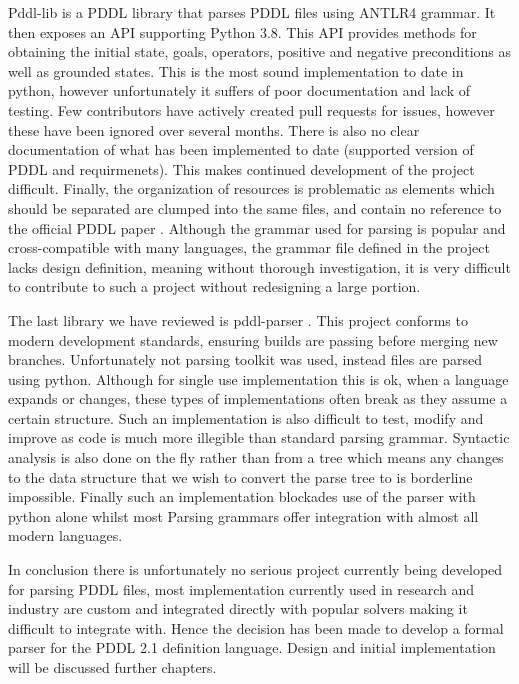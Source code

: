 Pddl-lib \cite{hfoffani23:online} is a PDDL library that parses PDDL files using ANTLR4 grammar. It then exposes an API supporting Python 3.8. This API provides methods for obtaining the initial state, goals, operators, positive and negative preconditions as well as grounded states. This is the most sound implementation to date in python, however unfortunately it suffers of poor documentation and lack of testing. Few contributors have actively created pull requests for issues, however these have been ignored over several months. There is also no clear documentation of what has been implemented to date (supported version of PDDL and requirmenets). This makes continued development of the project difficult. Finally, the organization of resources is problematic as elements which should be separated are clumped into the same files, and contain no reference to the official PDDL paper \cite{httpsarx9:online}. Although the grammar used for parsing is popular and cross-compatible with many languages, the grammar file defined in the project lacks design definition, meaning without thorough investigation, it is very difficult to contribute to such a project without redesigning a large portion.

The last library we have reviewed is pddl-parser \cite{pucrsaut37:online}. This project conforms to modern development standards, ensuring builds are passing before merging new branches. Unfortunately not parsing toolkit was used, instead files are parsed using python. Although for single use implementation this is ok, when a language expands or changes, these types of implementations often break as they assume a certain structure. Such an implementation is also difficult to test, modify and improve as code is much more illegible than standard parsing grammar.
Syntactic analysis is also done on the fly rather than from a tree which means any changes to the data structure that we wish to convert the parse tree to is borderline impossible. Finally such an implementation blockades use of the parser with python alone whilst most Parsing grammars offer integration with almost all modern languages.

In conclusion there is unfortunately no serious project currently being developed for parsing PDDL files, most implementation currently used in research and industry are custom and integrated directly with popular solvers making it difficult to integrate with. Hence the decision has been made to develop a formal parser for the PDDL 2.1 definition language. Design and initial implementation will be discussed further chapters.

